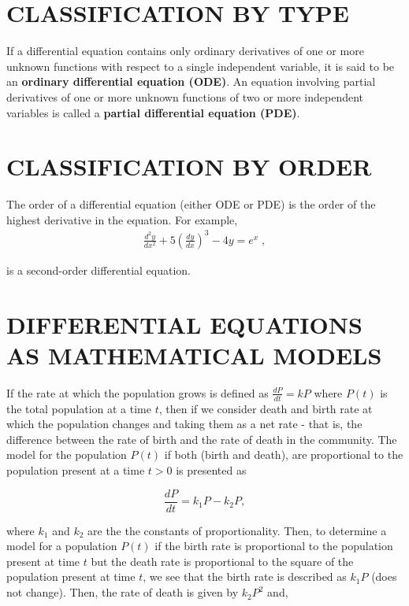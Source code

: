 \documentclass[12pt]{report}
\begin{document}
		\section{CLASSIFICATION BY TYPE}

		\par If a differential equation contains only ordinary derivatives of one or more unknown functions with respect to a single independent variable, it is said to be an \textbf{ordinary differential equation (ODE)}. An equation involving partial derivatives of one or more unknown functions of two or more independent variables is called a \textbf{partial differential equation (PDE)}.

		\section{CLASSIFICATION BY ORDER}

		\par The order of a differential equation (either ODE or PDE) is the order of the highest derivative in the equation. For example,
		\begin{align*}
			\frac{d^{2}y}{dx^{2}} + 5 \left( \frac{dy}{dx} \right)^3 - 4y = e^{x} \; ,
		\end{align*}
		\par is a second-order differential equation.

		\section{DIFFERENTIAL EQUATIONS AS MATHEMATICAL MODELS}

		If the rate at which the population grows is defined as $\frac{dP}{dt} = kP$ where $P(t)$ is the total population at a time $t$, then if we consider death and birth rate at which the population changes and taking them as a net rate - that is, the difference between the rate of birth and the rate of death in the community. The model for the population $P(t)$ if both (birth and death), are proportional to the population present at a time $t > 0$ is presented as

		\begin{equation}
			\frac{dP}{dt} = k_1P - k_2P,
		\end{equation}

		where $k_1$ and $k_2$ are the the constants of proportionality. Then, to determine a model for a population $P(t)$ if the birth rate is proportional to the population present at time $t$ but the death rate is proportional to the square of the population present at time $t$, we see that the birth rate is described as $k_1 P$ (does not change). Then, the rate of death is given by $k_2 P^2$ and,
\end{document}
